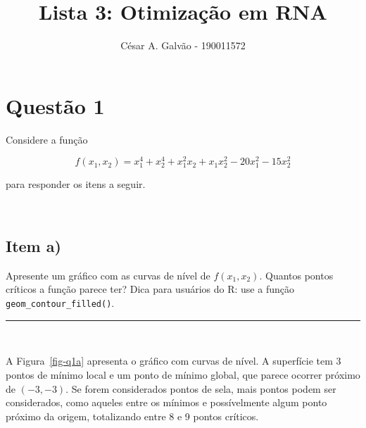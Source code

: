 \documentclass[
  a4paperpaper,
]{article}
\title{Lista 3: Otimização em RNA}
\author{César A. Galvão - 190011572}
\date{}
\begin{document}
\maketitle

\section{Questão 1}\label{questuxe3o-1}

Considere a função

\[
f(x_1, x_2) = x_1^4 + x_2^4 + x_1^2x_2+ x_1x_2^2 - 20x_1^2 - 15x_2^2
\]

\noindent para responder os itens a seguir.

~

\subsection{Item a)}\label{item-a}

Apresente um gráfico com as curvas de nível de \(f(x_1, x_2)\). Quantos
pontos críticos a função parece ter? Dica para usuários do R: use a
função \texttt{geom\_contour\_filled()}.

\begin{center}\rule{0.5\linewidth}{0.5pt}\end{center}

~

A Figura~\ref{fig-q1a} apresenta o gráfico com curvas de nível. A
superfície tem 3 pontos de mínimo local e um ponto de mínimo global, que
parece ocorrer próximo de \((-3,-3)\). Se forem considerados pontos de
sela, mais pontos podem ser considerados, como aqueles entre os mínimos
e possívelmente algum ponto próximo da origem, totalizando entre 8 e 9
pontos críticos.

~
\end{document}
